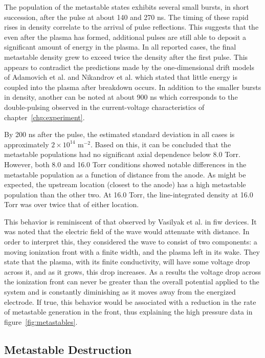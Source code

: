 The population of the metastable states exhibits several small bursts, in short
succession, after the pulse at about 140 and 270 ns. The timing of these rapid
rises in density correlate to the arrival of pulse reflections. This suggests
that the even after the plasma has formed, additional pulses are still able to
deposit a significant amount of energy in the plasma. In all reported cases, the
final metastable density grew to exceed twice the density after the first pulse.
This appears to contradict the predictions made by the one-dimensional drift
models of Adamovich et al. \cite{Adamovich2009} and Nikandrov et al.
\cite{Nikandrov2008} which stated that little energy is coupled into the plasma
after breakdown occurs. In addition to the smaller bursts in density, another
can be noted at about 900 ns which corresponds to the double-pulsing observed in
the current-voltage characteristics of chapter~\ref{chp:experiment}.

By 200 ns after the pulse, the estimated standard deviation in all cases is
approximately $2\times10^{14}$ m$^{-2}$. Based on this, it can be concluded that
the metastable populations had no significant axial dependence below 8.0 Torr.
However, both 8.0 and 16.0 Torr conditions showed notable differences in the
metastable population as a function of distance from the anode. As might be
expected, the upstream location (closest to the anode) has a high metastable
population than the other two. At 16.0 Torr, the line-integrated density at 16.0
Torr was over twice that of either location.

This behavior is reminiscent of that observed by Vasilyak et al.
\cite{Vasilyak1994} in \acs{fiw} devices. It was noted that the electric field
of the wave would attenuate with distance. In order to interpret this, they
considered the wave to consist of two components: a moving ionization front with
a finite width, and the plasma left in its wake. They state that the plasma,
with its finite conductivity, will have some voltage drop across it, and as it
grows, this drop increases. As a results the voltage drop across the ionization
front can never be greater than the overall potential applied to the system and
is constantly diminishing as it moves away from the energized electrode. If
true, this behavior would be associated with a reduction in the rate of
metastable generation in the front, thus explaining the high pressure data in
figure~\ref{fig:metastables}.

\subsection{Metastable Destruction}

